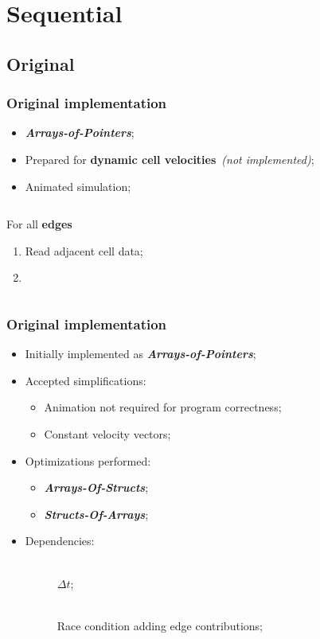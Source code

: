 \section{Sequential}

\subsection{Original}
\begin{frame}
	\frametitle{Original implementation}
	\begin{itemize}
		\item \textbf{\itshape Arrays-of-Pointers};
		\item Prepared for \textbf{dynamic cell velocities}\ \textit{(not implemented)};
		\item Animated simulation;
	\end{itemize}

	\begin{columns}
		\smaller
		\begin{block}{\computeflux}
			For all \textbf{edges}
			\begin{enumerate}
				\item Read adjacent cell data;	
				\item 
			\end{enumerate}
		\end{block}

		\begin{block}{\update}
		\end{block}
	\end{columns}
\end{frame}

\begin{frame}
	\frametitle{Original implementation}
	\begin{itemize}
		\vfill
		\item Initially implemented as \textbf{\itshape Arrays-of-Pointers};
		\vfill
		\item Accepted simplifications:
		\begin{itemize}
			\item Animation not required for program correctness;
			\item Constant velocity vectors;
		\end{itemize}
		\vfill
		\item Optimizations performed:
		\begin{itemize}
			\item \textbf{\itshape Arrays-Of-Structs};
			\item \textbf{\itshape Structs-Of-Arrays};
		\end{itemize}
		\vfill
		\item Dependencies:
		\begin{description}
			\item [\computeflux\hfill] \ \\$\Delta t$;
			\item [\update\hfill] \ \\Race condition adding edge contributions;
		\end{description}
		\vfill
	\end{itemize}
\end{frame}